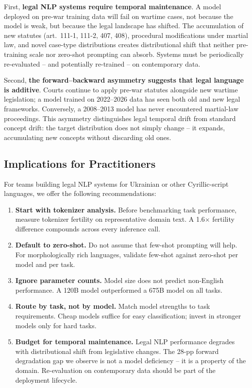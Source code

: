 \documentclass[11pt,a4paper]{article}
\begin{document}
First, \textbf{legal NLP systems require temporal maintenance}. A model deployed on pre-war training data will fail on wartime cases, not because the model is weak, but because the legal landscape has shifted. The accumulation of new statutes (art.~111-1, 111-2, 407, 408), procedural modifications under martial law, and novel case-type distributions creates distributional shift that neither pre-training scale nor zero-shot prompting can absorb. Systems must be periodically re-evaluated -- and potentially re-trained -- on contemporary data.

Second, \textbf{the forward--backward asymmetry suggests that legal language is additive}. Courts continue to apply pre-war statutes alongside new wartime legislation; a model trained on 2022--2026 data has seen both old and new legal frameworks. Conversely, a 2008--2013 model has never encountered martial-law proceedings. This asymmetry distinguishes legal temporal drift from standard concept drift: the target distribution does not simply change -- it expands, accumulating new concepts without discarding old ones.

\subsection{Implications for Practitioners}

For teams building legal NLP systems for Ukrainian or other Cyrillic-script languages, we offer the following recommendations:

\begin{enumerate}[leftmargin=*]
    \item \textbf{Start with tokenizer analysis.} Before benchmarking task performance, measure tokenizer fertility on representative domain text. A 1.6$\times$ fertility difference compounds across every inference call.
    \item \textbf{Default to zero-shot.} Do not assume that few-shot prompting will help. For morphologically rich languages, validate few-shot against zero-shot per model and per task.
    \item \textbf{Ignore parameter counts.} Model size does not predict non-English performance. A 120B model outperformed a 675B model on all tasks.
    \item \textbf{Route by task, not by model.} Match model strengths to task requirements. Cheap models suffice for easy classification; invest in stronger models only for hard tasks.
    \item \textbf{Budget for temporal maintenance.} Legal NLP performance degrades with distributional shift from legislative changes. The 28-pp forward degradation gap we observe is not a model deficiency -- it is a property of the domain. Re-evaluation on contemporary data should be part of the deployment lifecycle.
\end{enumerate}
\end{document}
